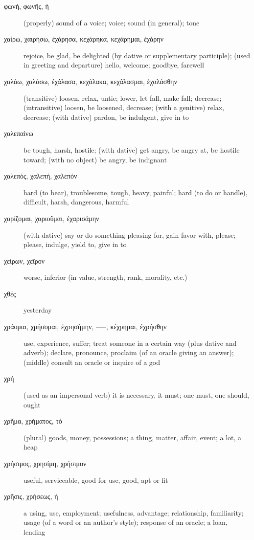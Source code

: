 \documentclass[12pt,letterpaper]{article}
\begin{document}
\begin{description}
    \item[\textgreek{φωνή, φωνῆς, ἡ}] \marginnote{*}(properly) sound of a voice; voice; sound (in general); tone
    \item[\textgreek{χαίρω, χαιρήσω, ἐχάρησα, κεχάρηκα, κεχάρημαι, ἐχάρην}] \marginnote{*}rejoice, be glad, be delighted (by dative or supplementary participle); (used in greeting and departure) hello, welcome; goodbye, farewell
    \item[\textgreek{χαλάω, χαλάσω, ἐχάλασα, κεχάλακα, κεχάλασμαι, ἐχαλάσθην}] (transitive) loosen, relax, untie; lower, let fall, make fall; decrease; (intransitive) loosen, be loosened, decrease; (with a genitive) relax, decrease; (with dative) pardon, be indulgent, give in to
    \item[\textgreek{χαλεπαίνω}] be tough, harsh, hostile; (with dative) get angry, be angry at, be hostile toward; (with no object) be angry, be indignant
    \item[\textgreek{χαλεπός, χαλεπή, χαλεπόν}] \marginnote{*}hard (to bear), troublesome, tough, heavy, painful; hard (to do or handle), difficult, harsh, dangerous, harmful
    \item[\textgreek{χαρίζομαι, χαριοῦμαι, ἐχαρισάμην}] (with dative) say or do something pleasing for, gain favor with, please; please, indulge, yield to, give in to
    \item[\textgreek{χείρων, χεῖρον}] \marginnote{*}worse, inferior (in value, strength, rank, morality, etc.)
    \item[\textgreek{χθές}] yesterday
    \item[\textgreek{χράομαι, χρήσομαι, ἐχρησήμην, –––, κέχρημαι, ἐχρήσθην}] \marginnote{*}use, experience, suffer; treat someone in a certain way (plus dative and adverb); declare, pronounce, proclaim (of an oracle giving an answer); (middle) consult an oracle or inquire of a god
    \item[\textgreek{χρή}] \marginnote{*}(used as an impersonal verb) it is necessary, it must; one must, one should, ought
    \item[\textgreek{χρῆμα, χρήματος, τό}] \marginnote{*}(plural) goods, money, possessions; a thing, matter, affair, event; a lot, a heap
    \item[\textgreek{χρήσιμος, χρησίμη, χρήσιμον}] \marginnote{*}useful, serviceable, good for use, good, apt or fit
    \item[\textgreek{χρῆσις, χρήσεως, ἡ}] a using, use, employment; usefulness, advantage; relationship, familiarity; usage (of a word or an author's style); response of an oracle; a loan, lending

\end{description}
\end{document}
